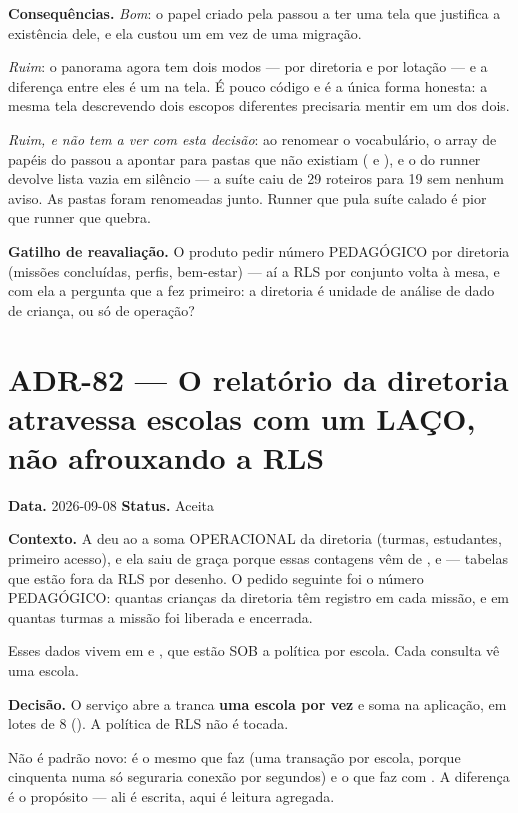 \textbf{Consequências.} \emph{Bom}: o papel criado pela  passou a ter
uma tela que justifica a existência dele, e ela custou um  em
vez de uma migração.

\emph{Ruim}: o panorama agora tem dois modos --- por diretoria e por lotação ---
e a diferença entre eles é um  na tela. É pouco
código e é a única forma honesta: a mesma tela descrevendo dois escopos
diferentes precisaria mentir em um dos dois.

\emph{Ruim, e não tem a ver com esta decisão}: ao renomear o vocabulário, o
array de papéis do  passou a apontar para pastas que
não existiam ( e ), e o  do
runner devolve lista vazia em silêncio --- a suíte caiu de 29 roteiros para 19
sem nenhum aviso. As pastas foram renomeadas junto. Runner que pula suíte calado
é pior que runner que quebra.

\textbf{Gatilho de reavaliação.} O produto pedir número PEDAGÓGICO por diretoria
(missões concluídas, perfis, bem-estar) --- aí a RLS por conjunto volta à mesa, e
com ela a pergunta que a  fez primeiro: a diretoria é unidade de
análise de dado de criança, ou só de operação?

\section{ADR-82 --- O relatório da diretoria atravessa escolas com um LAÇO, não
afrouxando a RLS}
\label{adr:relatorio-da-regional}

\textbf{Data.} 2026-09-08 \quad \textbf{Status.} Aceita

\textbf{Contexto.} A  deu ao  a soma
OPERACIONAL da diretoria (turmas, estudantes, primeiro acesso), e ela saiu de
graça porque essas contagens vêm de ,  e  ---
tabelas que estão fora da RLS por desenho. O pedido seguinte foi o número
PEDAGÓGICO: quantas crianças da diretoria têm registro em cada missão, e em
quantas turmas a missão foi liberada e encerrada.

Esses dados vivem em  e , que estão SOB a política
por escola. Cada consulta vê uma escola.

\textbf{Decisão.} O serviço abre a tranca \textbf{uma escola por vez} e soma na
aplicação, em lotes de 8 (). A política de RLS não é tocada.

Não é padrão novo: é o mesmo que  faz (uma transação por escola,
porque cinquenta numa só seguraria conexão por segundos) e o que
 faz com . A diferença é o
propósito --- ali é escrita, aqui é leitura agregada.

